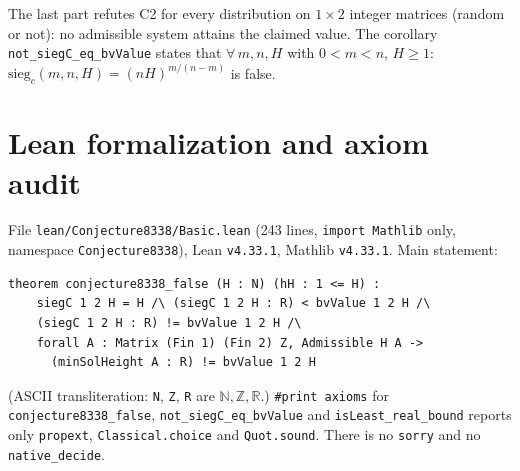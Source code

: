 \documentclass[11pt]{article}
\theoremstyle{definition}
\begin{document}
The last part refutes C2 for every distribution on $1\times 2$ integer matrices (random or not):
no admissible system attains the claimed value. The corollary \texttt{not\_siegC\_eq\_bvValue}
states that $\forall\,m,n,H$ with $0<m<n$, $H\ge 1$: $\mathrm{sieg}_c(m,n,H)=(nH)^{m/(n-m)}$ is
false.

\section{Lean formalization and axiom audit}

File \texttt{lean/Conjecture8338/Basic.lean} (243 lines, \texttt{import Mathlib} only, namespace
\texttt{Conjecture8338}), Lean \texttt{v4.33.1}, Mathlib \texttt{v4.33.1}. Main statement:
\begin{verbatim}
theorem conjecture8338_false (H : N) (hH : 1 <= H) :
    siegC 1 2 H = H /\ (siegC 1 2 H : R) < bvValue 1 2 H /\
    (siegC 1 2 H : R) != bvValue 1 2 H /\
    forall A : Matrix (Fin 1) (Fin 2) Z, Admissible H A ->
      (minSolHeight A : R) != bvValue 1 2 H
\end{verbatim}
(ASCII transliteration: \texttt{N}, \texttt{Z}, \texttt{R} are $\mathbb{N},\mathbb{Z},\mathbb{R}$.)
\texttt{\#print axioms} for \texttt{conjecture8338\_false}, \texttt{not\_siegC\_eq\_bvValue} and
\texttt{isLeast\_real\_bound} reports only \texttt{propext}, \texttt{Classical.choice} and
\texttt{Quot.sound}. There is no \texttt{sorry} and no \texttt{native\_decide}.
\end{document}
